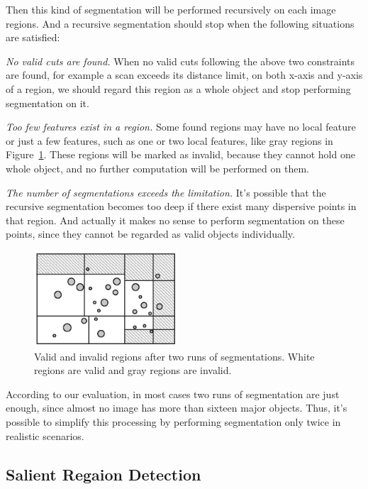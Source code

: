 Then this kind of segmentation will be performed recursively on each image regions. And a recursive segmentation should stop when the following situations are satisfied:

\squishlist
\item \textit{No valid cuts are found.} When no valid cuts following the above two constraints are found, for example a scan exceeds its distance limit, on both x-axis and y-axis of a region, we should regard this region as a whole object and stop performing segmentation on it.

\item \textit{Too few features exist in a region.} Some found regions may have no local feature or just a few features, such as one or two local features, like gray regions in Figure~\ref{fig:segmentation-2}. These regions will be marked as invalid, because they cannot hold one whole object, and no further computation will be performed on them.

\item \textit{The number of segmentations exceeds the limitation.} It's possible that the recursive segmentation becomes too deep if there exist many dispersive points in that region. And actually it makes no sense to perform segmentation on these points, since they cannot be regarded as valid objects individually.

\squishend

\begin{figure}[!ht]
\centering
\includegraphics[width=2.1in]{images/fig-segmentation-2.eps}
\caption{Valid and invalid regions after two runs of segmentations. White regions are valid and gray regions are invalid.}
\label{fig:segmentation-2}
\end{figure}


According to our evaluation, in most cases two runs of segmentation are just enough, since almost no image has more than sixteen major objects. Thus, it's possible to simplify this processing by performing segmentation only twice in realistic scenarios.

\subsection{Salient Regaion Detection}
\label{sec:algorithm_detection}

